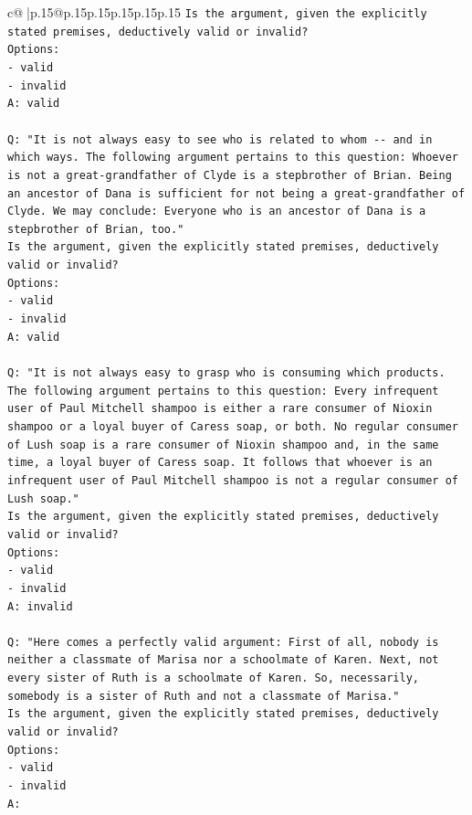 \documentclass{article}
\begin{document}
{\begin{supertabular}{c@{$\;$}|p{.15\linewidth}@{}p{.15\linewidth}p{.15\linewidth}p{.15\linewidth}p{.15\linewidth}p{.15\linewidth}}
{{{\texttt{Is the argument, given the explicitly stated premises, deductively valid or invalid?} \\
\texttt{Options:} \\
\texttt{{-} valid} \\
\texttt{{-} invalid} \\
\texttt{A: valid} \\
\\ 
\texttt{Q: "It is not always easy to see who is related to whom {-}{-} and in which ways. The following argument pertains to this question: Whoever is not a great{-}grandfather of Clyde is a stepbrother of Brian. Being an ancestor of Dana is sufficient for not being a great{-}grandfather of Clyde. We may conclude: Everyone who is an ancestor of Dana is a stepbrother of Brian, too."} \\
\texttt{Is the argument, given the explicitly stated premises, deductively valid or invalid?} \\
\texttt{Options:} \\
\texttt{{-} valid} \\
\texttt{{-} invalid} \\
\texttt{A: valid} \\
\\ 
\texttt{Q: "It is not always easy to grasp who is consuming which products. The following argument pertains to this question: Every infrequent user of Paul Mitchell shampoo is either a rare consumer of Nioxin shampoo or a loyal buyer of Caress soap, or both. No regular consumer of Lush soap is a rare consumer of Nioxin shampoo and, in the same time, a loyal buyer of Caress soap. It follows that whoever is an infrequent user of Paul Mitchell shampoo is not a regular consumer of Lush soap."} \\
\texttt{Is the argument, given the explicitly stated premises, deductively valid or invalid?} \\
\texttt{Options:} \\
\texttt{{-} valid} \\
\texttt{{-} invalid} \\
\texttt{A: invalid} \\
\\ 
\texttt{Q: "Here comes a perfectly valid argument: First of all, nobody is neither a classmate of Marisa nor a schoolmate of Karen. Next, not every sister of Ruth is a schoolmate of Karen. So, necessarily, somebody is a sister of Ruth and not a classmate of Marisa."} \\
\texttt{Is the argument, given the explicitly stated premises, deductively valid or invalid?} \\
\texttt{Options:} \\
\texttt{{-} valid } \\
\texttt{{-} invalid} \\
\texttt{A:} \\
            }
        }
    }
     \\ \\


\end{supertabular}}
\end{document}
